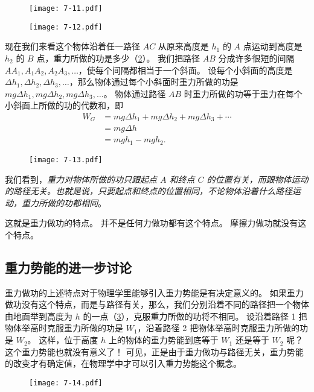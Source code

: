 \begin{figure}
  \begin{minipage}{0.48\linewidth}\centering
    \texttt{[image: 7-11.pdf]}
    \caption{}\label{fig:7-11}
  \end{minipage}
  \begin{minipage}{0.48\linewidth}\centering
    \texttt{[image: 7-12.pdf]}
    \caption{}\label{fig:7-12}
  \end{minipage}
\end{figure}

现在我们来看这个物体沿着任一路径 $AC$ 从原来高度是 $h_1$ 的 $A$ 点运动到高度是$h_2$ 的 $B$ 点，重力所做的功是多少（\cref{fig:7-13}）。
我们把路径 $AB$ 分成许多很短的间隔 $AA_1,A_1A_2,A_2A_3,\ldots$，使每个间隔都相当于一个斜面。
设每个小斜面的高度是 $\Delta h_1,\Delta h_2,\Delta h_3,\ldots$，那么物体通过每个小斜面时重力所做的功是 $mg\Delta h_1,mg\Delta h_2,mg\Delta h_3,\ldots$。
物体通过路径 $AB$ 时重力所做的功等于重力在每个小斜面上所做的功的代数和，即
\[\begin{split}
W_G&= mg\Delta h_1+mg\Delta h_2+mg\Delta h_3+\cdots\\
&=mg\Delta h\\
&=mgh_1-mgh_2.
\end{split} \]

\begin{figure}
  \texttt{[image: 7-13.pdf]}
  \caption{}\label{fig:7-13}
\end{figure}

我们看到，\emph{重力对物体所做的功只跟起点 $A$ 和终点 $C$ 的位置有关，而跟物体运动的路径无关。也就是说，只要起点和终点的位置相同，不论物体沿着什么路径运动，重力所做的功都相同}。

这就是重力做功的特点。
并不是任何力做功都有这个特点。
摩擦力做功就没有这个特点。

\subsection{重力势能的进一步讨论}

重力做功的上述特点对于物理学里能够引入重力势能是有决定意义的。
如果重力做功没有这个特点，而是与路径有关，那么，我们分别沿着不同的路径把一个物体由地面举到高度为 $h$ 的一点（\cref{fig:7-14}），克服重力所做的功将不相同。
设沿着路径 1 把物体举高时克服重力所做的功是 $W_1$，沿着路径 2 把物体举高时克服重力所做的功是 $W_2$。
这样，位于高度 $h$ 上的物体的重力势能到底等于 $W_1$ 还是等于 $W_2$ 呢？
这个重力势能也就没有意义了！
可见，正是由于重力做功与路径无关，重力势能的改变才有确定值，在物理学中才可以引入重力势能这个概念。
\begin{figure}
  \texttt{[image: 7-14.pdf]}
  \caption{}\label{fig:7-14}
\end{figure}

